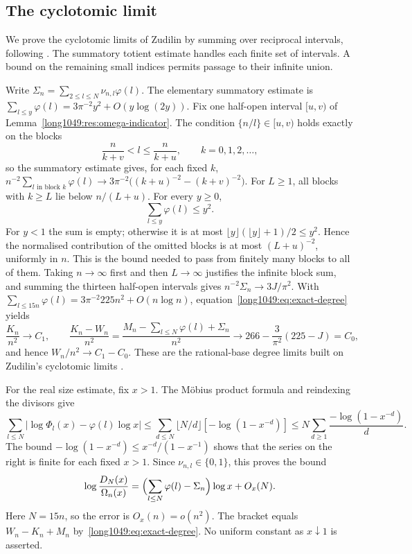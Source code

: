 \documentclass[11pt]{article}
\begin{document}
\subsection{The cyclotomic limit}\label{long1049:sec:cyclotomic-limit}

We prove the cyclotomic limits of Zudilin
\cite[Lemmas~1--2, p.~155]{zudilin2004} by summing over reciprocal
intervals, following \cite[Lemma~1, p.~466]{zudilin2002}. The
summatory totient estimate handles each finite set of intervals.
A bound on the remaining small indices permits passage to their
infinite union.

Write $\Sigma_n=\sum_{2\le l\le N}\nu_{n,l}\varphi(l)$.  The elementary
summatory estimate is $\sum_{l\le y}\varphi(l)=3\pi^{-2}y^{2}+O(y\log(2y))$.
Fix one half-open interval $[u,v)$ of Lemma~\ref{long1049:res:omega-indicator}.  The condition
$\{n/l\}\in[u,v)$ holds exactly on the blocks
\[
 \frac{n}{k+v}<l\le\frac{n}{k+u},\qquad k=0,1,2,\dots,
\]
so the summatory estimate gives, for each fixed $k$,
$n^{-2}\sum_{l\text{ in block }k}\varphi(l)\to3\pi^{-2}\bigl((k+u)^{-2}-(k+v)^{-2}\bigr)$.
For $L\ge1$, all blocks with $k\ge L$ lie below $n/(L+u)$. For every
$y\ge0$,
\[
 \sum_{l\le y}\varphi(l)\le y^2.
\]
For $y<1$ the sum is empty; otherwise it is at most
$\lfloor y\rfloor(\lfloor y\rfloor+1)/2\le y^2$. Hence the normalised
contribution of the omitted blocks is at most $(L+u)^{-2}$, uniformly
in $n$. This is the bound needed to pass from finitely many blocks to
all of them. Taking $n\to\infty$ first and then $L\to\infty$ justifies the
infinite block sum, and summing the thirteen half-open intervals gives
$n^{-2}\Sigma_n\to3J/\pi^{2}$.  With $\sum_{l\le15n}\varphi(l)=3\pi^{-2}225n^{2}+O(n\log n)$,
equation~\eqref{long1049:eq:exact-degree} yields
\begin{equation}\label{long1049:eq:degree-limits}
 \frac{K_n}{n^{2}}\to C_1,
 \qquad
 \frac{K_n-W_n}{n^{2}}=\frac{M_n-\sum_{l\le N}\varphi(l)+\Sigma_n}{n^{2}}
 \to266-\frac{3}{\pi^{2}}(225-J)=C_0,
\end{equation}
and hence $W_n/n^{2}\to C_1-C_0$.  These are the rational-base degree limits
built on Zudilin's cyclotomic limits \cite[Lemmas~1--2, p.~155; (26),
p.~162]{zudilin2004}.

For the real size estimate, fix $x>1$. The M\"obius product formula
and reindexing the divisors give
\[
 \sum_{l\le N}|\log\Phi_l(x)-\varphi(l)\log x|
 \le \sum_{d\le N}\lfloor N/d\rfloor[-\log(1-x^{-d})]
 \le N\sum_{d\ge1}\frac{-\log(1-x^{-d})}{d}.
\]
The bound $-\log(1-x^{-d})\le x^{-d}/(1-x^{-1})$ shows that the
series on the right is finite for each fixed $x>1$.
Since $\nu_{n,l}\in\{0,1\}$, this proves the bound
\begin{equation}\label{long1049:eq:cyclotomic-size}
 \log\frac{D_N(x)}{\Omega_n(x)}
 =\Bigl(\sum_{l\le N}\varphi(l)-\Sigma_n\Bigr)\log x+O_x(N).
\end{equation}
Here $N=15n$, so the error is $O_x(n)=o(n^2)$. The bracket equals
$W_n-K_n+M_n$ by~\eqref{long1049:eq:exact-degree}. No uniform constant as
$x\downarrow1$ is asserted.
\end{document}
